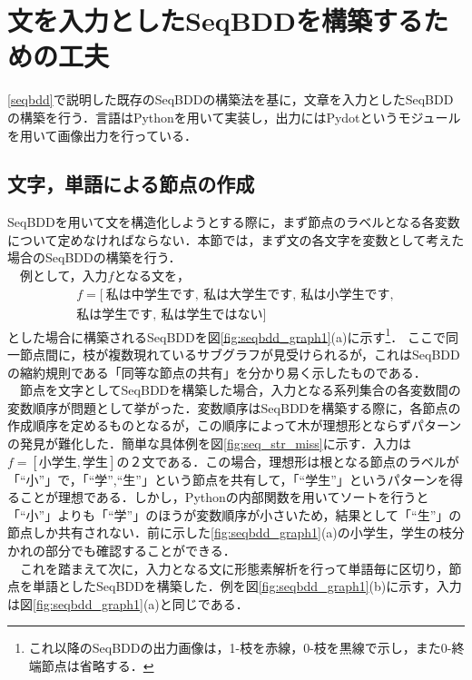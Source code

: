 \documentclass[12pt,twoside, fleqn]{ujbook}
\begin{document}
\newpage
\section{文を入力としたSeqBDDを構築するための工夫}
\label{text:build_seqbdd}
	\ref{seqbdd}で説明した既存のSeqBDDの構築法を基に，文章を入力としたSeqBDDの構築を行う．言語はPythonを用いて実装し，出力にはPydotというモジュールを用いて画像出力を行っている．


	\subsection{文字，単語による節点の作成}
	SeqBDDを用いて文を構造化しようとする際に，まず節点のラベルとなる各変数について定めなければならない．本節では，まず文の各文字を変数として考えた場合のSeqBDDの構築を行う．\\
	　例として，入力$f$となる文を，
	\begin{eqnarray*}
	\label{text:stream_str}	
	f=[\ 私は中学生です,\ 私は大学生です,\ 私は小学生です,\\ 私は学生です,\ 私は学生ではない]
	\end{eqnarray*}
	とした場合に構築されるSeqBDDを図\ref{fig:seqbdd_graph1}(a)に示す\footnote{これ以降のSeqBDDの出力画像は，1-枝を赤線，0-枝を黒線で示し，また0-終端節点は省略する．}．
	ここで同一節点間に，枝が複数現れているサブグラフが見受けられるが，これはSeqBDDの縮約規則である「同等な節点の共有」を分かり易く示したものである．\\
	　節点を文字としてSeqBDDを構築した場合，入力となる系列集合の各変数間の変数順序が問題として挙がった．変数順序はSeqBDDを構築する際に，各節点の作成順序を定めるものとなるが，この順序によって木が理想形とならずパターンの発見が難化した．簡単な具体例を図\ref{fig:seq_str_miss}に示す．入力は
	$f=[小学生, 学生]$の２文である．この場合，理想形は根となる節点のラベルが「``小''」で，「``学'',``生''」という節点を共有して，「``学生''」というパターンを得ることが理想である．しかし，Pythonの内部関数を用いてソートを行うと「``小''」よりも「``学''」のほうが変数順序が小さいため，結果として「``生''」の節点しか共有されない．前に示した\ref{fig:seqbdd_graph1}(a)の小学生，学生の枝分かれの部分でも確認することができる．\\
	　これを踏まえて次に，入力となる文に形態素解析を行って単語毎に区切り，節点を単語としたSeqBDDを構築した．例を図\ref{fig:seqbdd_graph1}(b)に示す，入力は図\ref{fig:seqbdd_graph1}(a)と同じである．
\end{document}
